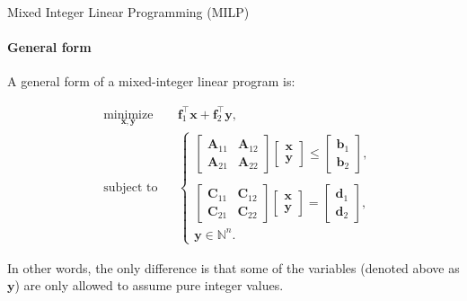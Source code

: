 \documentclass{beamer}
\begin{document}
\begin{frame}{Mixed Integer Linear Programming (MILP)}
\framesubtitle{General form}
\begin{flushleft}

A general form of a mixed-integer linear program is:

%
\begin{equation} \label{LP}
\begin{aligned}
& \underset{\mathbf{x}, \mathbf{y}}{\text{minimize}}
& & \mathbf{f}_1^\top \mathbf{x} + \mathbf{f}_2^\top \mathbf{y}, \\
& \text{subject to}
& & \begin{cases} 
\begin{bmatrix}
\mathbf{A}_{11} & \mathbf{A}_{12} \\
\mathbf{A}_{21} & \mathbf{A}_{22}
\end{bmatrix} 
\begin{bmatrix}
\mathbf{x} \\
\mathbf{y}
\end{bmatrix}
\leq 
\begin{bmatrix}
\mathbf{b}_1 \\
\mathbf{b}_2
\end{bmatrix}, \\ 
\\
\begin{bmatrix}
\mathbf{C}_{11} & \mathbf{C}_{12} \\
\mathbf{C}_{21} & \mathbf{C}_{22}
\end{bmatrix} 
\begin{bmatrix}
\mathbf{x} \\
\mathbf{y}
\end{bmatrix} = 
\begin{bmatrix}
\mathbf{d}_1 \\
\mathbf{d}_2
\end{bmatrix},  \\
\mathbf{y} \in \mathbb{N}^n.
\end{cases}
%
\end{aligned}
\end{equation}
 
In other words, the only difference is that some of the variables (denoted above as $\mathbf{y}$) are only allowed to assume pure integer values.
 
\end{flushleft}
\end{frame}
\end{document}
